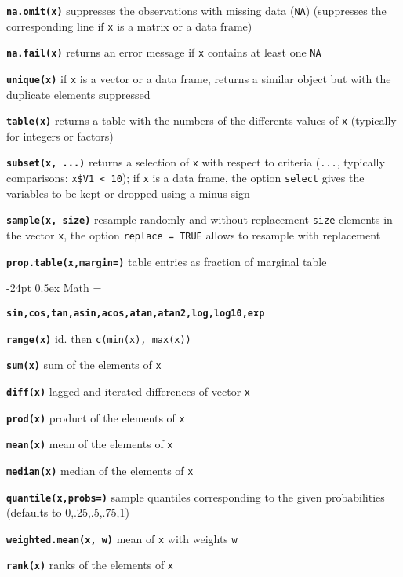 \documentclass[8pt,landscape]{article}
\makeatletter
\renewcommand\section{\@startsection{section}{1}{0mm}%
                                     {-24pt}%
                                     {0.5ex}%
                                {\color{blue}\normalfont\large\bfseries}}
\newcommand{\code}{\texttt}
\newcommand{\bcode}[1]{\texttt{\textbf{#1}}}
\makeatother
\begin{document}
\begin{multicols*}{3}
\bcode{na.omit(x)}  suppresses the observations with missing data (\code{NA}) (suppresses the corresponding line if \code{x} is a matrix or a data frame)

\bcode{na.fail(x)}  returns an error message if \code{x} contains at least one \code{NA}

\bcode{unique(x)}  if \code{x} is a vector or a data frame, returns a similar object but with the duplicate elements suppressed

\bcode{table(x)}  returns a table with the numbers of the differents values of \code{x} (typically for integers or factors)

\bcode{subset(x, ...)}  returns a selection of \code{x} with respect to criteria (\code{...}, typically comparisons: \code{x\$V1 < 10}); if \code{x} is a data frame, the option \code{select} gives the variables to be kept or dropped using a minus sign

\bcode{sample(x, size)}  resample randomly and without replacement \code{size} elements in the vector \code{x}, the option \code{replace = TRUE} allows to resample with replacement

\bcode{prop.table(x,margin=)} table entries as fraction of marginal table 




\section{Math}
\everypar={\hangindent=9mm}

\bcode{sin,cos,tan,asin,acos,atan,atan2,log,log10,exp}

\bcode{range(x)}  id. then \code{c(min(x), max(x))}

\bcode{sum(x)}  sum of the elements of \code{x}

\bcode{diff(x)}  lagged and iterated differences of vector \code{x}

\bcode{prod(x)}  product of the elements of \code{x}

\bcode{mean(x)}  mean of the elements of \code{x}

\bcode{median(x)}  median of the elements of \code{x}

\bcode{quantile(x,probs=)} sample quantiles
     corresponding to the given probabilities (defaults to 0,.25,.5,.75,1)

\bcode{weighted.mean(x, w)} mean of \code{x} with weights \code{w}

\bcode{rank(x)}  ranks of the elements of \code{x}


\end{multicols*}
\end{document}
